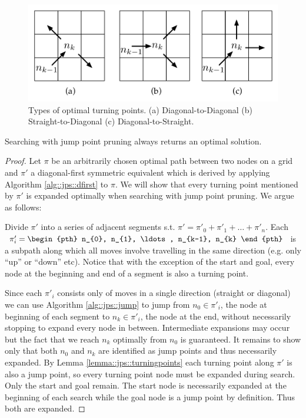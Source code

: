 \begin{figure}[tb]
       \begin{center}
		   \includegraphics[width=0.70\columnwidth, trim = 10mm 10mm 10mm 0mm]
			{chapter_jps/diagrams/turningpoints.pdf}
       \end{center}
	\vspace{-3pt}
       \caption[Types of turning points]
{\small
Types of optimal turning points. (a) Diagonal-to-Diagonal
(b) Straight-to-Diagonal (c) Diagonal-to-Straight.}
       \label{fig::jps::turningpoints}
\end{figure}

\begin{theorem}
\label{theorem::jps::jumping}
Searching with jump point pruning always returns an optimal solution. 
\end{theorem}
\begin{proof}
Let $\pi$ be an arbitrarily chosen optimal path between two nodes
on a grid and $\pi'$ a diagonal-first symmetric equivalent which is derived
by applying Algorithm \ref{alg::jps::dfirst} to $\pi$.
We will show that every turning point mentioned by $\pi'$ is expanded optimally 
when searching with jump point pruning. We argue as follows:
\par
Divide $\pi'$ into a series of adjacent segments s.t. 
$\pi' = \pi'_{0} + \pi'_{1} + \ldots + \pi'_{n} $. Each $\pi'_{i} = \begin{pth} n_{0}, n_{1},
\ldots, n_{k-1}, n_{k} \end{pth}$ is a subpath along which all moves involve
travelling in the same direction (e.g.  only ``up'' or ``down'' etc).  Notice
that with the exception of the start and goal, every node at the beginning and
end of a segment is also a turning point.
\par
Since each $\pi'_{i}$ consists only of moves in a single direction
(straight or diagonal) we can use Algorithm \ref{alg::jps::jump} to jump from $n_{0}
\in \pi'_{i}$, the node at beginning of each segment to $n_{k} \in \pi'_{i}$, the
node at the end, without necessarily stopping to expand every node in between.
Intermediate expansions may occur but the fact that we reach $n_{k}$
optimally from $n_{0}$ is guaranteed.
It remains to show only that both $n_{0}$ and $n_{k}$ are identified as
jump points and thus necessarily expanded. 
By Lemma \ref{lemma::jps::turningpoints} each turning point along $\pi'$ is 
also a jump point, so every turning point node must be expanded during search.
Only the start and goal remain. The start node is necessarily expanded at the
beginning of each search while the goal node is a jump point by definition.
Thus both are expanded.
\end{proof}
